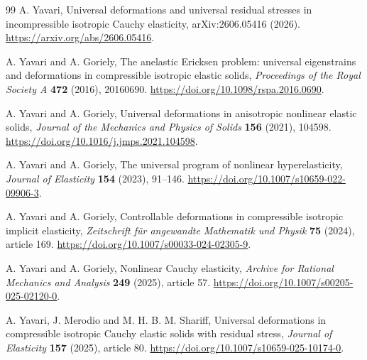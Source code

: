 \documentclass[11pt,a4paper]{article}
\numberwithin{equation}{section}
\theoremstyle{plain}
\theoremstyle{definition}
\theoremstyle{remark}
\begin{document}
\begin{thebibliography}{99}
A. Yavari,
Universal deformations and universal residual stresses in incompressible
isotropic Cauchy elasticity,
arXiv:2606.05416 (2026).
\url{https://arxiv.org/abs/2606.05416}.

A. Yavari and A. Goriely,
The anelastic Ericksen problem: universal eigenstrains and deformations in
compressible isotropic elastic solids,
\emph{Proceedings of the Royal Society A} \textbf{472} (2016), 20160690.
\url{https://doi.org/10.1098/rspa.2016.0690}.

A. Yavari and A. Goriely,
Universal deformations in anisotropic nonlinear elastic solids,
\emph{Journal of the Mechanics and Physics of Solids} \textbf{156}
(2021), 104598.
\url{https://doi.org/10.1016/j.jmps.2021.104598}.

A. Yavari and A. Goriely,
The universal program of nonlinear hyperelasticity,
\emph{Journal of Elasticity} \textbf{154} (2023), 91--146.
\url{https://doi.org/10.1007/s10659-022-09906-3}.

A. Yavari and A. Goriely,
Controllable deformations in compressible isotropic implicit elasticity,
\emph{Zeitschrift f\"ur angewandte Mathematik und Physik} \textbf{75}
(2024), article 169.
\url{https://doi.org/10.1007/s00033-024-02305-9}.

A. Yavari and A. Goriely,
Nonlinear Cauchy elasticity,
\emph{Archive for Rational Mechanics and Analysis} \textbf{249}
(2025), article 57.
\url{https://doi.org/10.1007/s00205-025-02120-0}.

A. Yavari, J. Merodio and M. H. B. M. Shariff,
Universal deformations in compressible isotropic Cauchy elastic solids with
residual stress,
\emph{Journal of Elasticity} \textbf{157} (2025), article 80.
\url{https://doi.org/10.1007/s10659-025-10174-0}.
\end{thebibliography}
\end{document}
